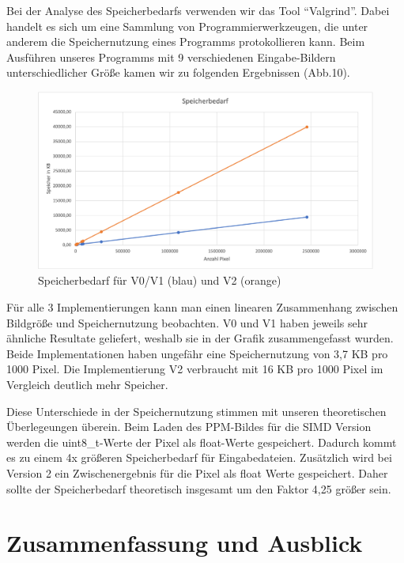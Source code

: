 \documentclass[course=erap]{aspdoc}
\begin{document}
\par
Bei der Analyse des Speicherbedarfs verwenden wir das Tool “Valgrind”. Dabei handelt es sich um eine Sammlung von Programmierwerkzeugen, die unter anderem die Speichernutzung eines Programms protokollieren kann. Beim Ausführen unseres Programms mit 9 verschiedenen Eingabe-Bildern unterschiedlicher Größe kamen wir zu folgenden Ergebnissen (Abb.10).

\begin{figure}[h]
\centering
\includegraphics[width=1\textwidth]{Bilder/Speicherbedarf2.png}
\caption{Speicherbedarf für V0/V1 (blau) und V2 (orange)}
\end{figure}

\par
Für alle 3 Implementierungen kann man einen linearen Zusammenhang zwischen Bildgröße und Speichernutzung beobachten. V0 und V1 haben jeweils sehr ähnliche Resultate geliefert, weshalb sie in der Grafik zusammengefasst wurden. Beide Implementationen haben ungefähr eine Speichernutzung von 3,7 KB pro 1000 Pixel. Die Implementierung V2 verbraucht mit 16 KB pro 1000 Pixel im Vergleich deutlich mehr Speicher.

\par
Diese Unterschiede in der Speichernutzung stimmen mit unseren theoretischen Überlegeungen überein. Beim Laden des PPM-Bildes für die SIMD Version werden die uint8\_t-Werte der Pixel als float-Werte gespeichert. Dadurch kommt es zu einem 4x größeren Speicherbedarf für Eingabedateien. Zusätzlich wird bei Version 2 ein Zwischenergebnis für die Pixel als float Werte gespeichert. Daher sollte der Speicherbedarf theoretisch insgesamt um den Faktor 4,25 größer sein. 

\section{Zusammenfassung und Ausblick}
\end{document}
